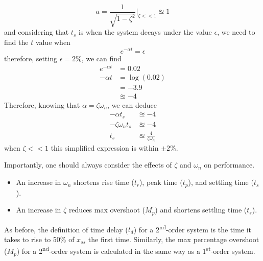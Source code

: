 \documentclass[12pt,letter]{article}
\numberwithin{ex}{section} %
\numberwithin{re}{section} %
\numberwithin{equation}{section}	%
\begin{document}
\begin{equation}
a = \frac{1}{\sqrt{1-\zeta^2}}\bigg|_{\zeta << 1} \approxeq 1
\end{equation}
and considering that $t_s$ is when the system decays under the value $\epsilon$, we need to find the $t$ value when
\begin{equation}
e^{- \alpha t} = \epsilon
\end{equation}
therefore, setting $\epsilon =2\%$, we can find
\begin{align}
e^{- \alpha t} &= 0.02 \\
- \alpha t &= \log(0.02) \\
&= -3.9 \nonumber \\
&\approxeq -4 \nonumber
\end{align}
Therefore, knowing that $\alpha = \zeta \omega_n$, we can deduce
\begin{align}
- \alpha t_s &\approxeq -4 \\
- \zeta \omega_n t_s &\approxeq -4 \nonumber \\
t_s &\approxeq \frac{4}{\zeta \omega_n} \nonumber
\end{align}
when $\zeta << 1$ this simplified expression is within $\pm 2\%$.

Importantly, one should always consider the effects of $\zeta$ and $\omega_n$ on performance. 
\begin{itemize}
\item An increase in $\omega_n$ shortens rise time ($t_r$), peak time ($t_p$), and settling time ($t_s$).
\item An increase in $\zeta$ reduces max overshoot ($M_p$) and shortens settling time ($t_s$).
\end{itemize}

As before, the definition of time delay ($t_d$) for a 2\textsuperscript{nd}-order system  is the time it takes to rise to 50\% of $x_{ss}$ the first time. Similarly, the max percentage overshoot ($M_p$) for a 2\textsuperscript{nd}-order system is calculated in the same way as a 1\textsuperscript{st}-order system.
\end{document}
